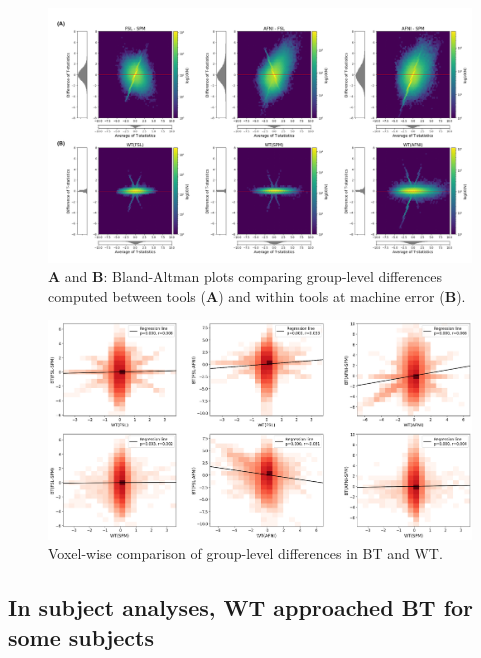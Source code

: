 \begin{figure}[ht]
  \centering
    \includegraphics[width=.9\textwidth]{chapters/chapter3/figures/unthresh-gl-frame.png}
    \caption{\textbf{A} and \textbf{B}: Bland-Altman plots comparing group-level differences computed between tools
    (\textbf{A}) and within tools at machine error (\textbf{B}).}%
  \label{fig:unthresh-maps}
\end{figure}

\begin{figure}[ht]
  \centering
  \includegraphics[width=.9\textwidth]{chapters/chapter3/figures/rel-corr-unthresh-with-masking.png}
  \caption{Voxel-wise comparison of group-level differences in BT and WT.}
  \label{fig:unthresh-maps-corr}
\end{figure}


\subsection{In subject analyses, WT approached BT for some subjects}

